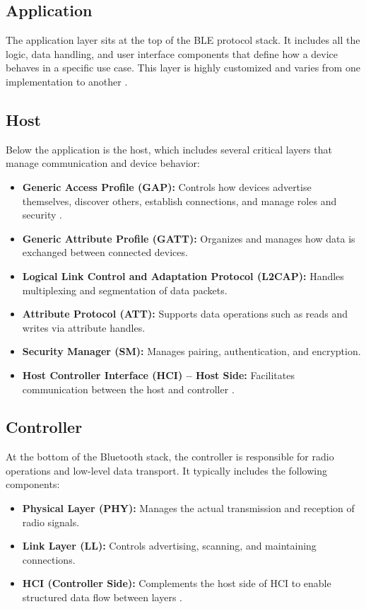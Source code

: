 \subsection{Application}

The application layer sits at the top of the BLE protocol stack. It includes all the logic, data handling, and user interface components that define how a device behaves in a specific use case. This layer is highly customized and varies from one implementation to another \cite{nextgenBLE}.

\subsection{Host}

Below the application is the host, which includes several critical layers that manage communication and device behavior:

\begin{itemize}
    \item \textbf{Generic Access Profile (GAP):} Controls how devices advertise themselves, discover others, establish connections, and manage roles and security \cite{nextgenBLE}.
    \item \textbf{Generic Attribute Profile (GATT):} Organizes and manages how data is exchanged between connected devices.
    \item \textbf{Logical Link Control and Adaptation Protocol (L2CAP):} Handles multiplexing and segmentation of data packets.
    \item \textbf{Attribute Protocol (ATT):} Supports data operations such as reads and writes via attribute handles.
    \item \textbf{Security Manager (SM):} Manages pairing, authentication, and encryption.
    \item \textbf{Host Controller Interface (HCI) – Host Side:} Facilitates communication between the host and controller \cite{nextgenBLE}.
\end{itemize}

\subsection{Controller}

At the bottom of the Bluetooth stack, the controller is responsible for radio operations and low-level data transport. It typically includes the following components:

\begin{itemize}
    \item \textbf{Physical Layer (PHY):} Manages the actual transmission and reception of radio signals.
    \item \textbf{Link Layer (LL):} Controls advertising, scanning, and maintaining connections.
    \item \textbf{HCI (Controller Side):} Complements the host side of HCI to enable structured data flow between layers \cite{nextgenBLE}.
\end{itemize}

